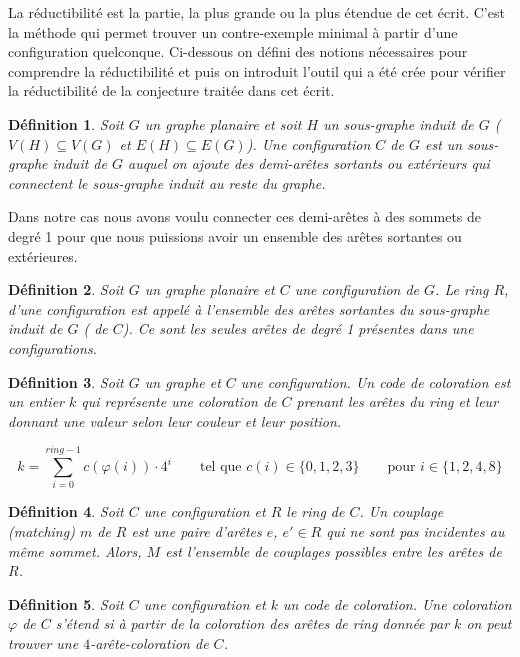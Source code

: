 \documentclass[10pt,a4paper]{article}
\newtheorem{definition}{Définition}
\begin{document}
La réductibilité est la partie, la plus grande ou la plus étendue de cet écrit. C'est la méthode qui permet trouver un contre-exemple minimal à partir d'une configuration quelconque. Ci-dessous on défini des notions nécessaires pour comprendre la réductibilité et puis on introduit l'outil qui a été crée pour vérifier la réductibilité de la conjecture traitée dans cet écrit.

\begin{definition}
Soit $G$ un graphe planaire et soit $H$ un sous-graphe induit de $G$  ($V(H) \subseteq V(G)$ et $E(H) \subseteq E(G)$). Une \emph{configuration} $C$ de $G$ est un sous-graphe induit de $G$ auquel on ajoute des demi-arêtes sortants ou extérieurs qui connectent le sous-graphe induit au reste du graphe.
\label{de:conf}
\end{definition}

{\color{red} Dans notre cas nous avons voulu connecter ces demi-arêtes à des sommets de degré 1 pour que nous puissions avoir un ensemble des arêtes sortantes ou extérieures.}

\begin{definition}
Soit $G$ un graphe planaire et $C$ une configuration de $G$. Le \emph{ring}  $R$, d'une configuration est appelé à l'ensemble des arêtes sortantes du sous-graphe induit de $G$ ({\color{blue} de $C$}). Ce sont les seules arêtes de degré 1 présentes dans une configurations.
\label{de:ring}
\end{definition}

\begin{definition}
Soit $G$ un graphe et $C$ une configuration. Un \emph{code de coloration} est un entier $k$ qui représente une coloration de $C$ prenant les arêtes du ring et leur donnant une valeur selon leur couleur et leur position.

$$
k = \sum_{i=0}^{ring-1} c(\varphi(i)) \cdot 4^{i} \qquad \textrm{tel que   } c(i) \in \{ 0,1,2,3 \} \qquad \textrm{pour  } i \in \{1,2,4,8 \}
$$
\label{de:code}
\end{definition}

\begin{definition}
Soit $C$ une configuration et $R$ le ring de $C$. Un \emph{couplage} (matching) $m$ de $R$ est une paire d'arêtes $e$, $e' \in R$ qui ne sont pas incidentes au même sommet. Alors, $M$ est l'ensemble de \emph{couplages} possibles entre les arêtes de $R$.
\label{de:coup}
\end{definition}

\begin{definition}
Soit $C$ une configuration et $k$ un code de coloration. Une coloration $\varphi$ de $C$ \emph{s'étend} si à partir de la coloration des arêtes de ring donnée par $k$ on peut trouver une $4$-arête-coloration de $C$.
\label{de:étend}
\end{definition}
\end{document}
